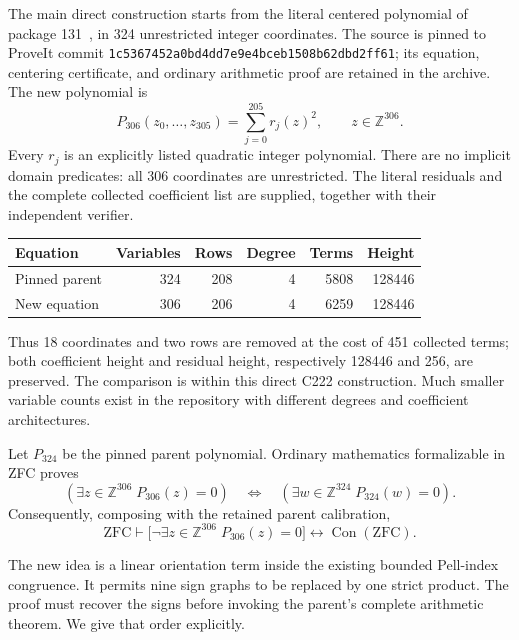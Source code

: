 \label{sec:signed306}

The main direct construction starts from the literal centered polynomial
of package 131~\cite{cap131}, in 324 unrestricted integer coordinates.  The source is
pinned to ProveIt commit
\texttt{1c5367452a0bd4dd7e9e4bceb1508b62dbd2ff61}; its equation, centering
certificate, and ordinary arithmetic proof are retained in the archive.
The new polynomial is
\begin{equation}\label{eq:306definition}
 P_{306}(z_0,\ldots,z_{305})=\sum_{j=0}^{205}r_j(z)^2,
 \qquad z\in\mathbb Z^{306}.
\end{equation}
Every $r_j$ is an explicitly listed quadratic integer polynomial.  There
are no implicit domain predicates: all 306 coordinates are unrestricted.
The literal residuals and the complete collected coefficient list are
supplied, together with their independent verifier.

\begin{center}
\begin{tabular}{lrrrrr}
\toprule
Equation & Variables & Rows & Degree & Terms & Height\\
\midrule
Pinned parent &324&208&4&5808&128446\\
New equation &306&206&4&6259&128446\\
\bottomrule
\end{tabular}
\end{center}

Thus 18 coordinates and two rows are removed at the cost of 451 collected
terms; both coefficient height and residual height, respectively 128446
and 256, are preserved.  The comparison is within this direct C222
construction.  Much smaller variable counts exist in the repository with
different degrees and coefficient architectures.

\begin{theorem}\label{thm:306-equivalence}
Let $P_{324}$ be the pinned parent polynomial.  Ordinary mathematics
formalizable in ZFC proves
\[
 (\exists z\in\mathbb Z^{306}\;P_{306}(z)=0)
 \quad\Longleftrightarrow\quad
 (\exists w\in\mathbb Z^{324}\;P_{324}(w)=0).
\]
Consequently, composing with the retained parent calibration,
\[
 \mathrm{ZFC}\vdash
 \bigl[\neg\exists z\in\mathbb Z^{306}\;P_{306}(z)=0\bigr]
 \longleftrightarrow\operatorname{Con}(\mathrm{ZFC}).
\]
\end{theorem}

The new idea is a linear orientation term inside the existing bounded
Pell-index congruence.  It permits nine sign graphs to be replaced by one
strict product.  The proof must recover the signs before invoking the
parent's complete arithmetic theorem.  We give that order explicitly.

